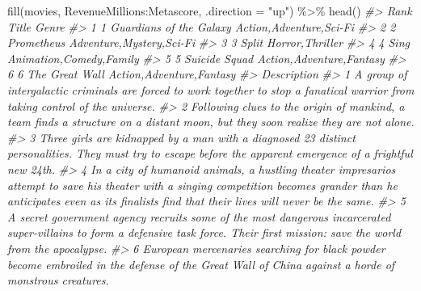 \documentclass[
]{book}
\newenvironment{Shaded}{\begin{snugshade}}{\end{snugshade}}
\newcommand{\AttributeTok}[1]{\textcolor[rgb]{0.77,0.63,0.00}{#1}}
\newcommand{\CommentTok}[1]{\textcolor[rgb]{0.56,0.35,0.01}{\textit{#1}}}
\newcommand{\FunctionTok}[1]{\textcolor[rgb]{0.00,0.00,0.00}{#1}}
\newcommand{\NormalTok}[1]{#1}
\newcommand{\SpecialCharTok}[1]{\textcolor[rgb]{0.00,0.00,0.00}{#1}}
\newcommand{\StringTok}[1]{\textcolor[rgb]{0.31,0.60,0.02}{#1}}
\begin{document}
\begin{Shaded}
\begin{Highlighting}[]
\FunctionTok{fill}\NormalTok{(movies, RevenueMillions}\SpecialCharTok{:}\NormalTok{Metascore, }\AttributeTok{.direction =} \StringTok{"up"}\NormalTok{) }\SpecialCharTok{\%\textgreater{}\%}
\FunctionTok{head}\NormalTok{()}
\CommentTok{\#\textgreater{}   Rank                   Title                    Genre}
\CommentTok{\#\textgreater{} 1    1 Guardians of the Galaxy  Action,Adventure,Sci{-}Fi}
\CommentTok{\#\textgreater{} 2    2              Prometheus Adventure,Mystery,Sci{-}Fi}
\CommentTok{\#\textgreater{} 3    3                   Split          Horror,Thriller}
\CommentTok{\#\textgreater{} 4    4                    Sing  Animation,Comedy,Family}
\CommentTok{\#\textgreater{} 5    5           Suicide Squad Action,Adventure,Fantasy}
\CommentTok{\#\textgreater{} 6    6          The Great Wall Action,Adventure,Fantasy}
\CommentTok{\#\textgreater{}                                                                                                                                                                                                                      Description}
\CommentTok{\#\textgreater{} 1                                                                                                A group of intergalactic criminals are forced to work together to stop a fanatical warrior from taking control of the universe.}
\CommentTok{\#\textgreater{} 2                                                                                                Following clues to the origin of mankind, a team finds a structure on a distant moon, but they soon realize they are not alone.}
\CommentTok{\#\textgreater{} 3                                                                  Three girls are kidnapped by a man with a diagnosed 23 distinct personalities. They must try to escape before the apparent emergence of a frightful new 24th.}
\CommentTok{\#\textgreater{} 4 In a city of humanoid animals, a hustling theater impresario\textquotesingle{}s attempt to save his theater with a singing competition becomes grander than he anticipates even as its finalists\textquotesingle{} find that their lives will never be the same.}
\CommentTok{\#\textgreater{} 5                                            A secret government agency recruits some of the most dangerous incarcerated super{-}villains to form a defensive task force. Their first mission: save the world from the apocalypse.}
\CommentTok{\#\textgreater{} 6                                                                             European mercenaries searching for black powder become embroiled in the defense of the Great Wall of China against a horde of monstrous creatures.}

\end{Highlighting}
\end{Shaded}
\end{document}
